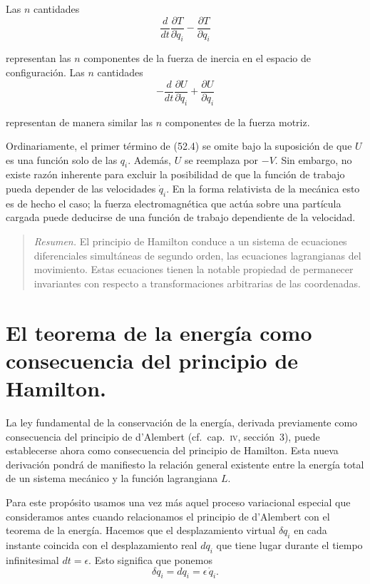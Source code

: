 \documentclass[12pt,a4paper]{book}
\begin{document}
Las $n$ cantidades
\begin{equation}
\frac{d}{dt}\frac{\partial T}{\partial \dot{q}_i} - \frac{\partial T}{\partial q_i} \tag{52.3}
\end{equation}

representan las $n$ componentes de la fuerza de inercia en el espacio de configuración. Las $n$ cantidades
\begin{equation}
-\frac{d}{dt}\frac{\partial U}{\partial \dot{q}_i} + \frac{\partial U}{\partial q_i} \tag{52.4}
\end{equation}

representan de manera similar las $n$ componentes de la fuerza motriz.

Ordinariamente, el primer término de (52.4) se omite bajo la suposición de que $U$ es una función solo de las $q_i$. Además, $U$ se reemplaza por $-V$. Sin embargo, no existe razón inherente para excluir la posibilidad de que la función de trabajo pueda depender de las velocidades $\dot{q}_i$. En la forma relativista de la mecánica esto es de hecho el caso; la fuerza electromagnética que actúa sobre una partícula cargada puede deducirse de una función de trabajo dependiente de la velocidad.

\begin{quote}
\textit{Resumen.} El principio de Hamilton conduce a un sistema de ecuaciones diferenciales simultáneas de segundo orden, las ecuaciones lagrangianas del movimiento. Estas ecuaciones tienen la notable propiedad de permanecer invariantes con respecto a transformaciones arbitrarias de las coordenadas.
\end{quote}

\section{El teorema de la energía como consecuencia del principio de Hamilton.}

La ley fundamental de la conservación de la energía, derivada previamente como consecuencia del principio de d'Alembert (cf.\ cap.\ \textsc{iv}, sección~3), puede establecerse ahora como consecuencia del principio de Hamilton. Esta nueva derivación pondrá de manifiesto la relación general existente entre la energía total de un sistema mecánico y la función lagrangiana $L$.

Para este propósito usamos una vez más aquel proceso variacional especial que consideramos antes cuando relacionamos el principio de d'Alembert con el teorema de la energía. Hacemos que el desplazamiento virtual $\delta q_i$ en cada instante coincida con el desplazamiento real $dq_i$ que tiene lugar durante el tiempo infinitesimal $dt = \epsilon$. Esto significa que ponemos
\begin{equation}
\delta q_i = dq_i = \epsilon\,\dot{q}_i. \tag{53.1}
\end{equation}
\end{document}
